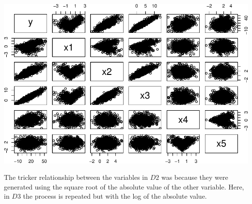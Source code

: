 \documentclass[12pt,twoside]{reedthesis}
\begin{document}
  \begin{Shaded}
  \begin{Highlighting}[]
  \end{Highlighting}
  \end{Shaded}
  
  \begin{center}\includegraphics{Thesis_files/figure-latex/sqrtAbs-1} \end{center}
  
  The tricker relationship between the variables in \(D2\) was because
  they were generated using the square root of the absolute value of the
  other variable. Here, in \(D3\) the process is repeated but with the log
  of the absolute value.
  
  \begin{Shaded}
  \begin{Highlighting}[]
  \StringTok{ }\NormalTok{(}\NormalTok{)}
  
  \StringTok{ }\NormalTok{*}\NormalTok{(}\StringTok{ }\NormalTok{(}\NormalTok{)}
  
  \StringTok{ }\StringTok{ }\StringTok{ }\NormalTok{(}\NormalTok{)}
  
  \StringTok{ }\NormalTok{(}\NormalTok{)}
  
  \StringTok{ }\NormalTok{*}\NormalTok{(}\StringTok{ }\NormalTok{(}\NormalTok{)}
  
  \StringTok{ }\StringTok{ }\StringTok{ } \NormalTok{*}\StringTok{ }\StringTok{ }\StringTok{ }\StringTok{ }\NormalTok{(}\NormalTok{)}
  
  \StringTok{ }
  
  \end{Highlighting}
  \end{Shaded}
  
\end{document}
